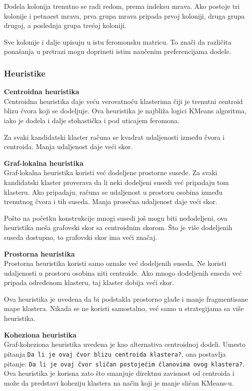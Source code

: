 \documentclass[11pt]{article}
\begin{document}
Dodela kolonija trenutno se radi redom, prema indeksu mrava. Ako postoje tri kolonije i petnaest mrava, prva grupa mrava pripada prvoj koloniji, druga grupa drugoj, a poslednja grupa trećoj koloniji.

Sve kolonije i dalje upisuju u istu feromonsku matricu. To znači da različita ponašanja u pretrazi mogu doprineti istim naučenim preferencijama dodele.

\subsubsection{Heuristike}

\textbf{Centroidna heuristika} \\
Centroidna heuristika daje veću verovatnoću klasterima čiji je trenutni centroid blizu čvora koji se dodeljuje. Ova heuristika je najbliža logici KMeans algoritma, iako je dodela i dalje stohastička i pod uticajem feromona.

Za svaki kandidatski klaster računa se kvadrat udaljenosti između čvora i centroida. Manja udaljenost daje veći skor.

\textbf{Graf-lokalna heuristika} \\
Graf-lokalna heuristika koristi već dodeljene prostorne susede. Za svaki kandidatski klaster proverava da li neki dodeljeni susedi već pripadaju tom klasteru. Ako pripadaju, računa se udaljenost u prostoru osobina između trenutnog čvora i tih suseda. Manja prosečna udaljenost daje veći skor.

Pošto na početku konstrukcije mnogi susedi još mogu biti nedodeljeni, ova heuristika meša grafovski skor sa centroidnim skorom. Što je više dodeljenih suseda dostupno, to grafovski skor ima veći značaj.

\textbf{Prostorna heuristika} \\
Prostorna heuristika koristi samo oznake već dodeljenih suseda. Ne koristi udaljenosti u prostoru osobina niti centroide. Ako mnogo dodeljenih suseda već pripada određenom klasteru, taj klaster dobija veći skor.

Ova heuristika je uvedena da bi podstakla prostorno glađe i manje fragmentisane mape klastera. Nikada se ne koristi samostalno, već samo u strategijama sa više heuristika.

\textbf{Koheziona heuristika} \\
Graf-koheziona heuristika uvedena je kao alternativa centroidnoj dodeli. Umesto pitanja \texttt{Da li je ovaj čvor blizu centroida klastera?}, ona postavlja pitanje: \texttt{Da li je ovaj čvor sličan postojećim članovima ovog klastera?}. Ova heuristika je korisna zato što smanjuje direktnu zavisnost od centroida i može da predstavi koheziju klastera na način koji je manje sličan KMeans-u.
\end{document}
